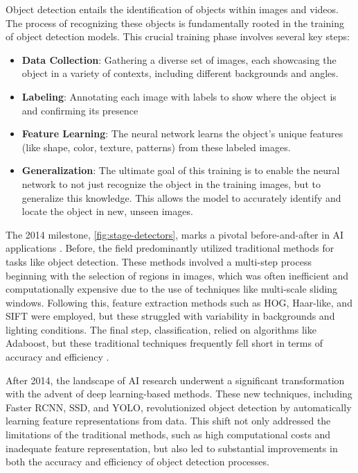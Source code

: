 Object detection entails the identification of objects within images and videos. The process of recognizing these objects is fundamentally rooted in the training of object detection models. This crucial training phase involves several key steps:
\begin{itemize}
    \item \textbf{Data Collection}: Gathering a diverse set of images, each showcasing the object in a variety of contexts, including different backgrounds and angles.
    \item \textbf{Labeling}: Annotating each image with labels to show where the object is and confirming its presence
    \item \textbf{Feature Learning}: The neural network learns the object's unique features (like shape, color, texture, patterns) from these labeled images.
    \item \textbf{Generalization}: The ultimate goal of this training is to enable the neural network to not just recognize the object in the training images, but to generalize this knowledge. This allows the model to accurately identify and locate the object in new, unseen images.
\end{itemize} 

The 2014 milestone, \ref{fig:stage-detectors}, marks a pivotal before-and-after in AI applications \cite{rfc22}. Before, the field predominantly utilized traditional methods for tasks like object detection. These methods involved a multi-step process beginning with the selection of regions in images, which was often inefficient and computationally expensive due to the use of techniques like multi-scale sliding windows. Following this, feature extraction methods such as HOG, Haar-like, and SIFT were employed, but these struggled with variability in backgrounds and lighting conditions. The final step, classification, relied on algorithms like Adaboost, but these traditional techniques frequently fell short in terms of accuracy and efficiency \cite{rfc9}.

After 2014, the landscape of AI research underwent a significant transformation with the advent of deep learning-based methods. These new techniques, including Faster RCNN, SSD, and YOLO, revolutionized object detection by automatically learning feature representations from data. This shift not only addressed the limitations of the traditional methods, such as high computational costs and inadequate feature representation, but also led to substantial improvements in both the accuracy and efficiency of object detection processes.

